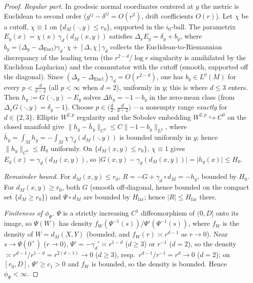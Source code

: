 \documentclass[11pt]{article}
\theoremstyle{remark}
\newcommand{\Rem}{R}
\newcommand{\dM}{d_M}
\begin{document}
\begin{proof}
\emph{Regular part.} In geodesic normal coordinates centered at $y$ the metric is
Euclidean to second order ($g^{ij}-\delta^{ij}=O(r^2)$, drift coefficients $O(r)$). Let
$\chi$ be a cutoff, $\chi\equiv1$ on $\{\dM(\cdot,y)\le r_0\}$, supported in the
$i_0$-ball. The parametrix $E_y(x)=\chi(x)\,\gamma_d(\dM(x,y))$ satisfies
$\Delta_x E_y=\delta_y+b_y$, where $b_y=\bigl(\Delta_g-\Delta_{\mathrm{Eucl}}\bigr)\gamma_d\cdot\chi
+[\Delta,\chi]\gamma_d$ collects the Euclidean-to-Riemannian discrepancy of the leading
term (the $r^{2-d}$/$\log r$ singularity is annihilated by the Euclidean Laplacian) and
the commutator with the cutoff (smooth, supported off the diagonal). Since
$(\Delta_g-\Delta_{\mathrm{Eucl}})\gamma_d=O(r^{2-d})$, one has $b_y\in L^p(M)$ for every
$p<\tfrac{d}{d-2}$ (all $p<\infty$ when $d=2$), uniformly in $y$; this is where $d\le3$
enters. Then $h_y:=G(\cdot,y)-E_y$ solves $\Delta h_y=-1-b_y$ in the zero-mean class
(from $\Delta_x G(\cdot,y)=\delta_y-1$). Choose $p\in\bigl(\tfrac d2,\tfrac{d}{d-2}\bigr)$
---a nonempty range \emph{exactly} for $d\in\{2,3\}$. Elliptic $W^{2,p}$ regularity and
the Sobolev embedding $W^{2,p}\hookrightarrow C^0$ on the closed manifold give
$\lVert h_y-\bar h_y\rVert_{C^0}\le C\lVert-1-b_y\rVert_{L^p}$, where
$\bar h_y=\int_M h_y=-\int_M\chi\,\gamma_d(\dM(\cdot,y))$ is bounded uniformly in $y$;
hence $\lVert h_y\rVert_{C^0}\le H_0$ uniformly. On $\{\dM(x,y)\le r_0\}$, $\chi\equiv1$
gives $E_y(x)=\gamma_d(\dM(x,y))$, so $\lvert G(x,y)-\gamma_d(\dM(x,y))\rvert
=\lvert h_y(x)\rvert\le H_0$.

\emph{Remainder bound.} For $\dM(x,y)\le r_0$, $\Rem=-G+\gamma_d\circ\dM=-h_y$, bounded by
$H_0$. For $\dM(x,y)\ge r_0$, both $G$ (smooth off-diagonal, hence bounded on the compact
set $\{\dM\ge r_0\}$) and $\Psi\circ\dM$ are bounded by $H_{\mathrm{far}}$; hence
$\lvert\Rem\rvert\le H_{\mathrm{far}}$ there.

\emph{Finiteness of $\phi_\Psi$.} $\Psi$ is a strictly increasing $C^1$ diffeomorphism of
$(0,D]$ onto its image, so $\Psi(W)$ has density $f_W(\Psi^{-1}(s))/\Psi'(\Psi^{-1}(s))$,
where $f_W$ is the density of $W=\dM(X,Y)$ (bounded, and $f_W(r)\asymp r^{d-1}$ as
$r\to0$). Near $s\to\Psi(0^+)$ ($r\to0$), $\Psi'=-\gamma_d'\asymp r^{1-d}$ ($d\ge3$) or
$r^{-1}$ ($d=2$), so the density $\asymp r^{d-1}/r^{1-d}=r^{2(d-1)}\to0$ ($d\ge3$), resp.\
$r^{d-1}/r^{-1}=r^{d}\to0$ ($d=2$); on $[r_0,D]$, $\Psi'\ge c_1>0$ and $f_W$ is bounded, so
the density is bounded. Hence $\phi_\Psi<\infty$.
\end{proof}
\end{document}
